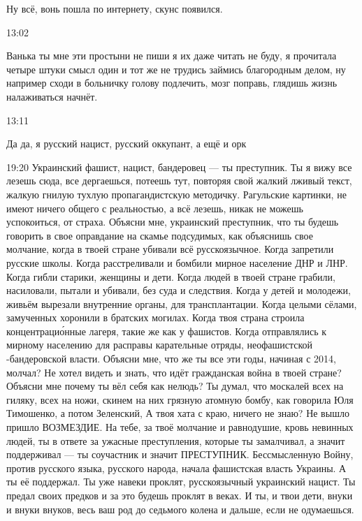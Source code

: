 Ну всё, вонь пошла по интернету, скунс появился.

13:02

Ванька ты мне эти простыни не пиши я их даже читать не буду, я прочитала четыре
штуки смысл один и тот же не трудись займись благородным делом, ну например
сходи в больничку голову подлечить, мозг поправь, глядишь жизнь налаживаться
начнёт.

13:11

Да да, я русский нацист, русский оккупант, а ещё и орк🤣

19:20
Украинский фашист, нацист, бандеровец — ты преступник. Ты я вижу все лезешь сюда, все дергаешься, потеешь
тут, повторяя свой жалкий лживый текст, жалкую гнилую тухлую пропагандистскую методичку. Рагульские картинки, не имеют ничего
общего с реальностью, а всё лезешь, никак не можешь успокоиться, от страха.
Объясни мне,
украинский преступник, что ты будешь говорить в свое оправдание на скамье подсудимых, как объяснишь свое молчание, когда в твоей стране убивали всё русскоязычное.
Когда запретили русские школы.
Когда расстреливали и бомбили мирное население ДНР и ЛНР.
Когда гибли старики, женщины и дети.
Когда людей в твоей стране грабили, насиловали, пытали и убивали, без суда и следствия.
Когда у детей и молодежи, живьём вырезали внутренние органы, для трансплантации.
Когда целыми сёлами, замученных хоронили в братских могилах.
Когда твоя страна строила концентрацио́нные лагеря, такие же как у фашистов.
Когда отправлялись к мирному населению для расправы карательные отряды, неофашистской -бандеровской власти.
Объясни мне, что же ты все эти годы, начиная с 2014, молчал? Не хотел видеть и знать, что идёт гражданская война в твоей стране?
Объясни мне почему ты вёл себя как нелюдь?
Ты думал, что москалей всех на гиляку, всех на ножи, скинем на них грязную атомную бомбу, как говорила Юля Тимошенко, а потом Зеленский,
А твоя хата с краю, ничего не знаю?
Не вышло пришло ВОЗМЕЗДИЕ.
На тебе, за твоё молчание и равнодушие,
кровь невинных людей,
ты в ответе за ужасные преступления, которые ты замалчивал, а значит поддерживал — ты соучастник и значит ПРЕСТУПНИК.
Бессмысленную Войну, против русского языка,
русского народа, начала фашистская власть Украины.
А ты её поддержал.
Ты уже навеки проклят, русскоязычный украинский нацист.
Ты предал своих предков и за это будешь проклят в веках.
И ты, и твои дети, внуки и внуки внуков, весь ваш род до седьмого колена и дальше, если не одумаешься.
